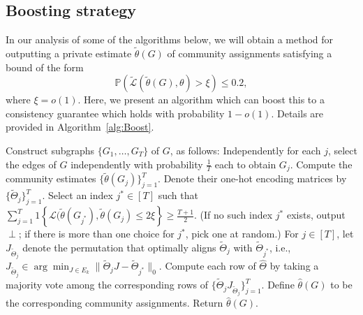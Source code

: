 \documentclass{article}
\newcommand{\mprob}{\mathbb{P}}
\newcommand{\thetahat}{\ensuremath{\widehat{\theta}}}
\newcommand{\Thetahat}{\ensuremath{\widehat{\Theta}}}
\begin{document}

\subsection{Boosting strategy}

In our analysis of some of the algorithms below, we will obtain a method for outputting a private estimate $\widetilde{\theta}(G)$ of community assignments satisfying a bound of the form
\begin{equation*}
\mprob(\widetilde{\mathcal{L}}(\widetilde{\theta}(G), \theta) > \xi) \le 0.2,
\end{equation*}
where $\xi = o(1)$. Here, we present an algorithm which can boost this to a consistency guarantee which holds with probability $1-o(1)$. Details are provided in Algorithm~\ref{alg:Boost}.

\begin{algorithm}[h!]
\caption{Graph-based boosting}
\label{alg:Boost}
\begin{algorithmic}[1]
    \State Construct subgraphs $\{G_1, \dots, G_T\}$ of $G$, as follows: Independently for each $j$, select the edges of $G$ independently with probability $\frac{1}{T}$ each to obtain $G_j$.
    \State Compute the community estimates $\{\widetilde{\theta}(G_j)\}_{j=1}^T$. Denote their one-hot encoding matrices by $\{\widetilde{\Theta}_j\}_{j=1}^T$.
    \State Select an index $j^* \in [T]$ such that $\sum_{j=1}^T 1\left\{\mathcal{L}(\widetilde{\theta}(G_{j^*}), \widetilde{\theta}(G_j) \le 2\xi\right\} \ge \frac{T+1}{2}$. (If no such index $j^*$ exists, output $\perp$; if there is more than one choice for $j^*$, pick one at random.)
    \State For $j \in [T]$, let $J_{\widetilde{\Theta}_j}$ denote the permutation that optimally aligns $\widetilde{\Theta}_j$ with $\widetilde{\Theta}_{j^*}$, i.e., $J_{\widetilde{\Theta}_{j}} \in \arg\min_{J \in E_k} \|\widetilde{\Theta}_j J - \widetilde{\Theta}_{j^*}\|_0$.
    \State Compute each row of $\Thetahat$ by taking a majority vote among the corresponding rows of $\{\widetilde{\Theta}_j J_{\widetilde{\Theta}_j}\}_{j=1}^T$. Define $\thetahat(G)$ to be the corresponding community assignments.
    \State Return $\thetahat(G)$.
\EndFunction
\end{algorithmic}
\end{algorithm}
\end{document}
